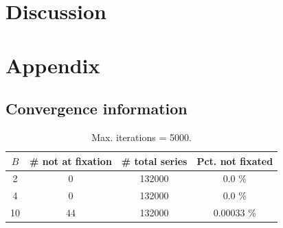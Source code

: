 \documentclass[letterpaper,11.5pt]{scrartcl}
\begin{document}







\section{Discussion}




\setlength{\bibleftmargin}{.125in}
\setlength{\bibindent}{-\bibleftmargin}

% 



\appendix

\section{Appendix}



\subsection{Convergence information}

\begin{table}[h]
  \caption{Max. iterations = 5000.}
  \centering
  \begin{tabular}{cccc} \toprule
    $B$ & \# not at fixation & \# total series & Pct. not fixated \\
    \midrule  
    2  & 0  & 132000 & 0.0 \% \\
    4  & 0  & 132000 & 0.0 \% \\
    10 & 44 & 132000 & 0.00033  \% \\
    \bottomrule
  \end{tabular} 
\end{table}
\end{document}
